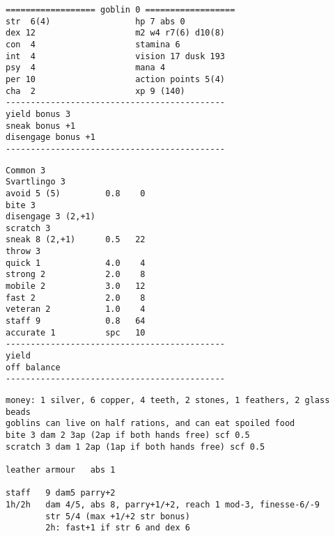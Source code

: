 \begin{verbatim}
================== goblin 0 ==================
str  6(4)                 hp 7 abs 0
dex 12                    m2 w4 r7(6) d10(8)
con  4                    stamina 6
int  4                    vision 17 dusk 193
psy  4                    mana 4
per 10                    action points 5(4)
cha  2                    xp 9 (140)
--------------------------------------------
yield bonus 3
sneak bonus +1
disengage bonus +1
--------------------------------------------
\end{verbatim} \goodbreak \begin{verbatim}
Common 3
Svartlingo 3
avoid 5 (5)         0.8    0
bite 3
disengage 3 (2,+1)
scratch 3
sneak 8 (2,+1)      0.5   22
throw 3
quick 1             4.0    4
strong 2            2.0    8
mobile 2            3.0   12
fast 2              2.0    8
veteran 2           1.0    4
staff 9             0.8   64
accurate 1          spc   10
--------------------------------------------
yield
off balance
--------------------------------------------
\end{verbatim} \goodbreak \begin{verbatim}
money: 1 silver, 6 copper, 4 teeth, 2 stones, 1 feathers, 2 glass beads
goblins can live on half rations, and can eat spoiled food
bite 3 dam 2 3ap (2ap if both hands free) scf 0.5
scratch 3 dam 1 2ap (1ap if both hands free) scf 0.5

leather armour   abs 1

staff   9 dam5 parry+2
1h/2h   dam 4/5, abs 8, parry+1/+2, reach 1 mod-3, finesse-6/-9
        str 5/4 (max +1/+2 str bonus)
        2h: fast+1 if str 6 and dex 6

\end{verbatim}
\normalsize






































































